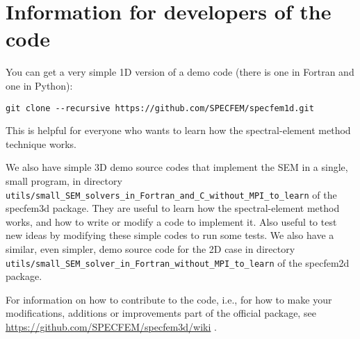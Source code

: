 
\chapter{Information for developers of the code}\label{cha:developers}

You can get a very simple 1D version of a demo code (there is one in Fortran and one in Python):
\begin{verbatim}
git clone --recursive https://github.com/SPECFEM/specfem1d.git
\end{verbatim}
This is helpful for everyone who wants to learn how the spectral-element method technique works.\newline


\noindent
We also have simple 3D demo source codes that implement the SEM in a single, small program, in directory\newline
\texttt{utils/small\_SEM\_solvers\_in\_Fortran\_and\_C\_without\_MPI\_to\_learn} of the specfem3d package.
They are useful to learn how the spectral-element method works, and how to write or modify a code to implement it.
Also useful to test new ideas by modifying these simple codes to run some tests.
We also have a similar, even simpler, demo source code for the 2D case in directory\newline
\texttt{utils/small\_SEM\_solver\_in\_Fortran\_without\_MPI\_to\_learn} of the specfem2d package.\newline


\noindent
For information on how to contribute to the code, i.e., for how to make your modifications, additions or improvements part of the
official package, see \url{https://github.com/SPECFEM/specfem3d/wiki} .


